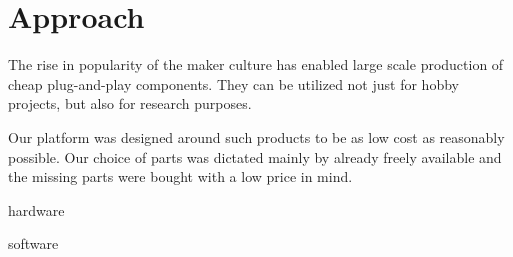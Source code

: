 \documentclass[class=report, crop=false]{standalone}
\begin{document}
\chapter{Approach}\label{cha:approach}
\pagestyle{scrheadings}
The rise in popularity of the maker culture has enabled large scale production of cheap plug-and-play components. They can be utilized not just for hobby projects, but also for research purposes.

Our platform was designed around such products to be as low cost as reasonably possible. Our choice of parts was dictated mainly by already freely available and the missing parts were bought with a low price in mind.

{hardware}

{software}
\end{document}
